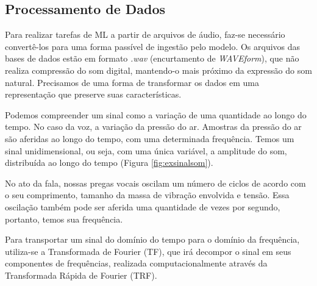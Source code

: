 \subsection{Processamento de Dados}\label{sec:procdados}

Para realizar tarefas de \acrshort{ML} a partir de arquivos de áudio, faz-se necessário convertê-los para uma forma passível de ingestão pelo modelo. Os arquivos das bases de dados estão em formato \textit{.wav} (encurtamento de \textit{WAVEform}), que não realiza compressão do som digital, mantendo-o mais próximo da expressão do som natural. Precisamos de uma forma de transformar os dados em uma representação que preserve suas características.

Podemos compreender um sinal como a variação de uma quantidade ao longo do tempo. No caso da voz, a variação da pressão do ar. Amostras da pressão do ar são aferidas ao longo do tempo, com uma determinada frequência. Temos um sinal unidimensional, ou seja, com uma única variável, a amplitude do som, distribuída ao longo do tempo (Figura \ref{fig:exsinalsom}).

No ato da fala, nossas pregas vocais oscilam um número de ciclos de acordo com o  seu comprimento, tamanho da massa de vibração envolvida e tensão. Essa oscilação também pode ser aferida uma quantidade de vezes por segundo, portanto, temos sua frequência.


Para transportar um sinal do domínio do tempo para o domínio da frequência, utiliza-se a Transformada de Fourier (\acrshort{TF}), que irá decompor o sinal em seus componentes de frequências, realizada computacionalmente através da Transformada Rápida de Fourier (\acrshort{TRF}).


